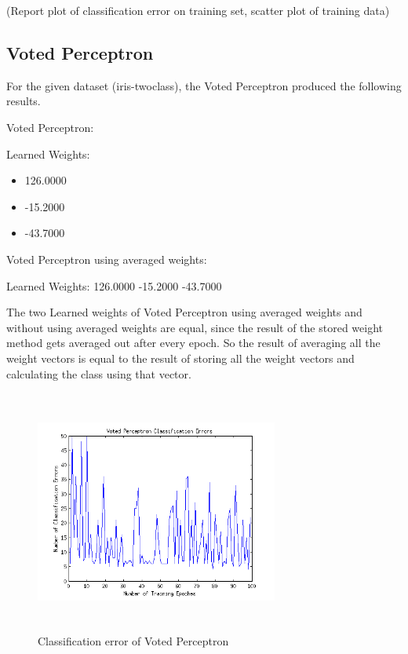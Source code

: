 \documentclass[12pt]{article}
\begin{document}
(Report plot of classification error on training set, scatter plot of training data)

\subsection{Voted Perceptron}

For the given dataset (iris-twoclass), the Voted Perceptron produced the following results.

Voted Perceptron:

Learned Weights:
\begin{itemize}
  \item 126.0000  
  \item -15.2000
  \item -43.7000
\end{itemize}

Voted Perceptron using averaged weights:

Learned Weights:
  126.0000  
  -15.2000
  -43.7000

The two Learned weights of Voted Perceptron using averaged weights and without using averaged weights are equal, since the result of the stored weight method gets averaged out after every epoch. So the result of averaging all the weight vectors is equal to the result of storing all the weight vectors and calculating the class using that vector.

\begin{figure}[htbp]
  \includegraphics[width=80mm,height=80mm]{img/voted_errors.png}
  \caption{Classification error of Voted Perceptron}
\end{figure}
\end{document}
